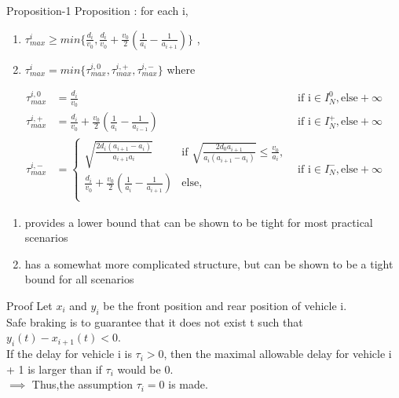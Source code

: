 \documentclass{beamer}
\providecommand{\brak}[1]{\ensuremath{\left(#1\right)}}
\begin{document}
\begin{frame}{Proposition-1}
    Proposition : for each i,
    \begin{enumerate}
        \item $\tau_{max}^{i} \geq min
        \big\{\frac{d_{i}}{v_{0}},\frac{d_{i}}{v_{0}} + \frac{v_{0}}{2}(\frac{1}{a_{i}} - \frac{1}{a_{i+1}})\big\}$ ,\\
        \item $\tau_{max}^{i} = min\big\{\tau_{max}^{i,0},\tau_{max}^{i,+}, \tau_{max}^{i,-}\big\} $ where 
    \end{enumerate}
    \begin{align}
        \tau_{max}^{i,0} &= \frac{d_{i}}{v_{0}} &\text{if i} \in I_{N}^{0},\text{else} + \infty    \nonumber\\
        \tau_{max}^{i,+} &= \frac{d_{i}}{v_{0}} + \frac{v_{0}}{2}(\frac{1}{a_{i}} - \frac{1}{a_{i-1}}) &\text{if i} \in I_{N}^{+}, \text{else} + \infty    \nonumber \\
        \tau_{max}^{i,-} &= 
    \begin{cases}
        \sqrt{\frac{2d_{i}(a_{i+1}-a_{i})}{a_{i+1}a_{i}}} & \text{if } \sqrt{\frac{2d_{0}a_{i+1}}{a_{i}(a_{i+1}-a_{i})}} \leq \frac{v_{0}}{a_{i}},  \nonumber\\
        \frac{d_{i}}{v_{0}} + \frac{v_{0}}{2}\brak{\frac{1}{a_{i}}-\frac{1}{a_{i+1}}} &\text{else},   \nonumber\\
    \end{cases}
    &\text{if i} \in I^{-}_{N}, \text{else} +\infty   \nonumber
    \end{align} 
\end{frame}
\begin{frame}
\begin{enumerate}
    \item  provides a lower bound that can be shown to be tight
for most practical scenarios \\
   \item   has a somewhat more complicated structure, but can be shown to be a tight bound for all scenarios
\end{enumerate}
\begin{block}{Proof}
Let $x_{i}$ and $y_{i}$ be the front position and rear position of vehicle i. \\Safe braking is to guarantee that it does not exist t such that $y_i (t) - x_{i+1} (t) < 0$.\\
 If the delay for vehicle i is $\tau_{i} > 0$, then the maximal allowable
delay for vehicle i + 1 is larger than if $τ_{i}$ would be 0.\\
$\implies$ Thus,the assumption $\tau_{i} = 0$ is made.
\end{block}
\end{frame}
\end{document}

